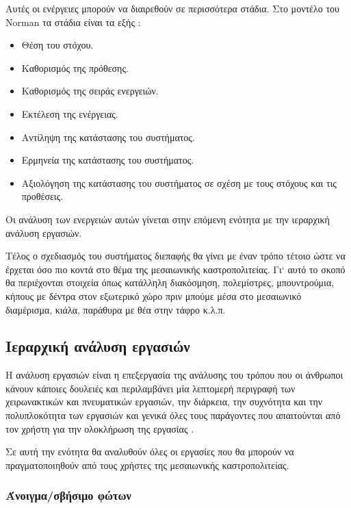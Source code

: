 \documentclass{assignment}
\begin{document}
Αυτές οι ενέργειες μπορούν να διαιρεθούν σε περισσότερα στάδια. Στο μοντέλο του Norman τα στάδια είναι τα εξής \cite{class_notes}:
\begin{itemize}
\item Θέση του στόχου.
\item Καθορισμός της πρόθεσης.
\item Καθορισμός της σειράς ενεργειών.
\item Εκτέλεση της ενέργειας.
\item Αντίληψη της κατάστασης του συστήματος.
\item Ερμηνεία της κατάστασης του συστήματος.
\item Αξιολόγηση της κατάστασης του συστήματος σε σχέση με τους στόχους και τις προθέσεις.
\end{itemize}

Οι ανάλυση των ενεργειών αυτών γίνεται στην επόμενη ενότητα με την ιεραρχική ανάλυση εργασιών. 


Τέλος ο σχεδιασμός του συστήματος διεπαφής θα γίνει με έναν τρόπο τέτοιο ώστε να έρχεται όσο πιο κοντά στο θέμα της μεσαιωνικής καστροπολιτείας. Γι` αυτό το σκοπό θα περιέχονται στοιχεία όπως κατάλληλη διακόσμηση, πολεμίστρες, μπουντρούμια, κήπους με δέντρα στον εξωτερικό χώρο πριν μπούμε μέσα στο μεσαιωνικό διαμέρισμα, κιάλα, παράθυρα με θέα στην τάφρο κ.λ.π. 

\subsection{Ιεραρχική ανάλυση εργασιών}

Η ανάλυση εργασιών είναι η επεξεργασία της ανάλυσης του τρόπου που οι άνθρωποι κάνουν κάποιες δουλειές και περιλαμβάνει μία λεπτομερή περιγραφή των χειρωνακτικών και πνευματικών εργασιών, την διάρκεια, την συχνότητα και την πολυπλοκότητα των εργασιών και γενικά όλες τους παράγοντες που απαιτούνται από τον χρήστη για την ολοκλήρωση της εργασίας \cite{class_notes,wiki:task_analysis}.

Σε αυτή την ενότητα θα αναλυθούν όλες οι εργασίες που θα μπορούν να πραγματοποιηθούν από τους χρήστες της μεσαιωνικής καστροπολιτείας.

\subsubsection{Άνοιγμα/σβήσιμο φώτων}
\end{document}
